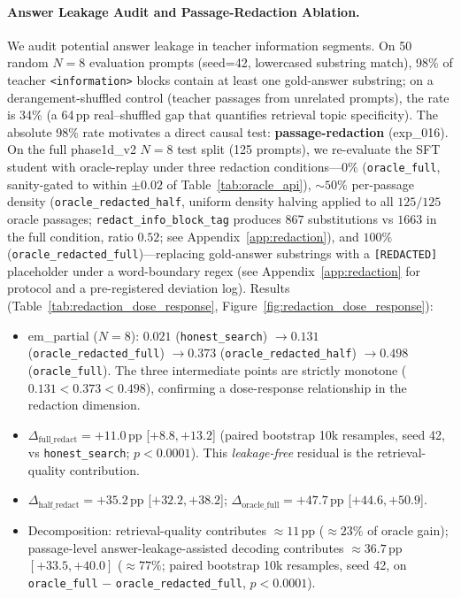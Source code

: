\paragraph{Answer Leakage Audit and Passage-Redaction Ablation.}
We audit potential answer leakage in teacher information segments. On 50 random $N{=}8$ evaluation prompts (seed=42, lowercased substring match), 98\% of teacher \texttt{<information>} blocks contain at least one gold-answer substring; on a derangement-shuffled control (teacher passages from unrelated prompts), the rate is 34\% (a 64\,pp real--shuffled gap that quantifies retrieval topic specificity). The absolute 98\% rate motivates a direct causal test: \textbf{passage-redaction} (exp\_016). On the full phase1d\_v2 $N{=}8$ test split (125 prompts), we re-evaluate the SFT student with oracle-replay under three redaction conditions---$0\%$ (\texttt{oracle\_full}, sanity-gated to within $\pm0.02$ of Table~\ref{tab:oracle_api}), $\sim\!50\%$ per-passage density (\texttt{oracle\_redacted\_half},
uniform density halving applied to all $125/125$ oracle passages;
\texttt{redact\_info\_block\_tag} produces $867$ substitutions vs $1663$
in the full condition, ratio $0.52$; see Appendix~\ref{app:redaction}), and $100\%$ (\texttt{oracle\_redacted\_full})---replacing gold-answer substrings with a \texttt{[REDACTED]} placeholder under a word-boundary regex (see Appendix~\ref{app:redaction} for protocol and a pre-registered deviation log). Results (Table~\ref{tab:redaction_dose_response}, Figure~\ref{fig:redaction_dose_response}):
\begin{itemize}[leftmargin=*,nosep]
  \item em\_partial ($N{=}8$): $0.021$ (\texttt{honest\_search}) $\to 0.131$ (\texttt{oracle\_redacted\_full}) $\to 0.373$ (\texttt{oracle\_redacted\_half}) $\to 0.498$ (\texttt{oracle\_full}). The three intermediate points are strictly monotone ($0.131 < 0.373 < 0.498$), confirming a dose-response relationship in the redaction dimension.
  \item $\Delta_{\text{full\_redact}} = +11.0$\,pp [$+8.8, +13.2$] (paired bootstrap 10k resamples, seed 42, vs \texttt{honest\_search}; $p < 0.0001$). This \emph{leakage-free} residual is the retrieval-quality contribution.
  \item $\Delta_{\text{half\_redact}} = +35.2$\,pp [$+32.2, +38.2$]; $\Delta_{\text{oracle\_full}} = +47.7$\,pp [$+44.6, +50.9$].
  \item Decomposition: retrieval-quality contributes $\approx 11$\,pp ($\approx 23\%$ of oracle gain); passage-level answer-leakage-assisted decoding contributes $\approx 36.7$\,pp $[+33.5, +40.0]$ ($\approx 77\%$; paired bootstrap 10k resamples, seed 42, on \texttt{oracle\_full} $-$ \texttt{oracle\_redacted\_full}, $p < 0.0001$).
\end{itemize}

